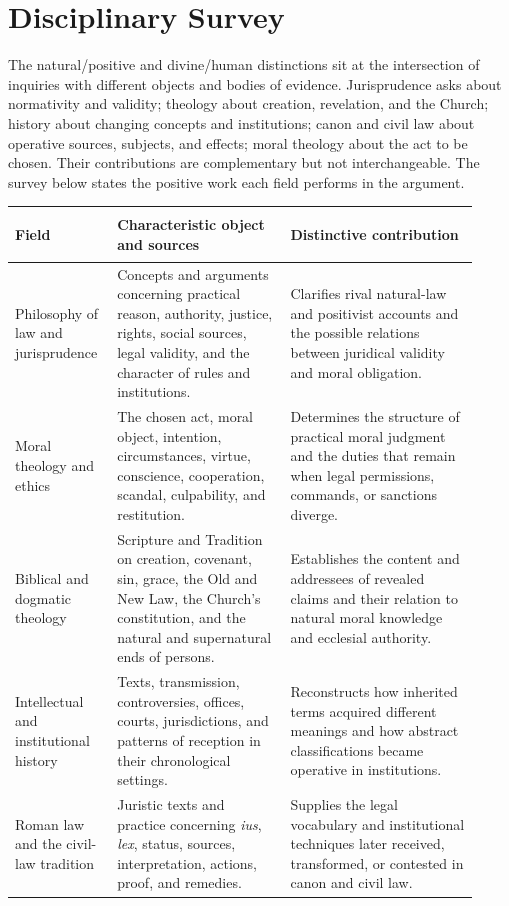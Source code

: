 \section{Disciplinary Survey}

The natural/positive and divine/human distinctions sit at the intersection of inquiries with different objects and bodies of evidence. Jurisprudence asks about normativity and validity; theology about creation, revelation, and the Church; history about changing concepts and institutions; canon and civil law about operative sources, subjects, and effects; moral theology about the act to be chosen. Their contributions are complementary but not interchangeable. The survey below states the positive work each field performs in the argument.

\begin{longtable}{>{\bfseries\raggedright\arraybackslash}p{0.19\linewidth}>{\raggedright\arraybackslash}p{0.35\linewidth}>{\raggedright\arraybackslash}p{0.38\linewidth}}
\toprule
\textbf{Field} & \textbf{Characteristic object and sources} & \textbf{Distinctive contribution}\\
\midrule
\endhead
Philosophy of law and jurisprudence & Concepts and arguments concerning practical reason, authority, justice, rights, social sources, legal validity, and the character of rules and institutions. & Clarifies rival natural-law and positivist accounts and the possible relations between juridical validity and moral obligation.\\
Moral theology and ethics & The chosen act, moral object, intention, circumstances, virtue, conscience, cooperation, scandal, culpability, and restitution. & Determines the structure of practical moral judgment and the duties that remain when legal permissions, commands, or sanctions diverge.\\
Biblical and dogmatic theology & Scripture and Tradition on creation, covenant, sin, grace, the Old and New Law, the Church's constitution, and the natural and supernatural ends of persons. & Establishes the content and addressees of revealed claims and their relation to natural moral knowledge and ecclesial authority.\\
Intellectual and institutional history & Texts, transmission, controversies, offices, courts, jurisdictions, and patterns of reception in their chronological settings. & Reconstructs how inherited terms acquired different meanings and how abstract classifications became operative in institutions.\\
Roman law and the civil-law tradition & Juristic texts and practice concerning \emph{ius}, \emph{lex}, status, sources, interpretation, actions, proof, and remedies. & Supplies the legal vocabulary and institutional techniques later received, transformed, or contested in canon and civil law.\\

\end{longtable}
